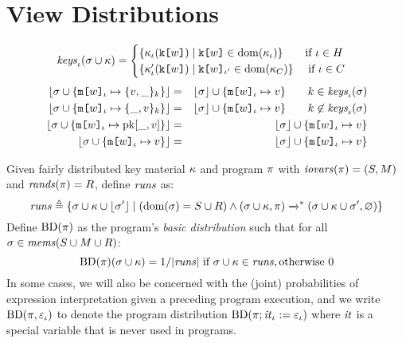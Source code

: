 \section{View Distributions}


\begin{definition}[Patterns]
  $$
  \mathit{keys}_{\iota}(\sigma \cup \kappa) =
  \begin{cases}
    \{ \kappa_\iota(\texttt{k[}w\texttt{]}) \mid \texttt{k[}w\texttt{]} \in \mathrm{dom}(\kappa_\iota) \} \qquad \text{if} \ \iota \in H \\
    \{ \kappa_\iota'(\texttt{k[}w\texttt{]}) \mid \texttt{k[}w\texttt{]}_{\iota'} \in \mathrm{dom}(\kappa_C)  \} \quad\ \text{if}\ \iota \in C
  \end{cases}
  $$
  \begin{eqnarray*}
    \lfloor \sigma \cup \{ \texttt{m[}w\texttt{]}_{\iota} \mapsto \{ v,\_ \}_{k} \} \rfloor &=&
    \lfloor \sigma \rfloor \cup \{ \texttt{m[}w\texttt{]}_{\iota} \mapsto v \} \qquad k \in \mathit{keys}_{\iota}(\sigma)\\
    \lfloor \sigma \cup \{ \texttt{m[}w\texttt{]}_{\iota} \mapsto \{ \_,v \}_{k} \} \rfloor &=&
    \lfloor \sigma \rfloor \cup \{ \texttt{m[}w\texttt{]}_{\iota} \mapsto v \} \qquad k \not\in \mathit{keys}_{\iota}(\sigma)\\
    \lfloor \sigma \cup \{ \texttt{m[}w\texttt{]}_{\iota} \mapsto \mathrm{pk}[\_,v]\} \rfloor &=&
    \lfloor \sigma \rfloor \cup \{ \texttt{m[}w\texttt{]}_{\iota} \mapsto v \} \\
    \lfloor \sigma \cup \{ \texttt{m[}w\texttt{]}_{\iota} \mapsto v\} \rfloor &=&
    \lfloor \sigma \rfloor \cup \{ \texttt{m[}w\texttt{]}_{\iota} \mapsto v \} 
  \end{eqnarray*}
\end{definition}

\begin{definition}
  \label{def-progtt}
  \label{definition-progtt}
  Given fairly distributed key material $\kappa$ and program $\pi$ with $\mathit{iovars}(\pi) = (S,M)$ and $\mathit{rands}(\pi) = R$,
  define $\mathit{runs}$ as:
  $$
  \mathit{runs} \triangleq \{ \sigma \cup \kappa \cup \lfloor \sigma' \rfloor \mid (\mathrm{dom}(\sigma) = S \cup R) \wedge (\sigma \cup \kappa,\pi) \xrightarrow{}^{*}
  (\sigma \cup \kappa \cup \sigma',\varnothing) \}
  $$
  Define $\mathrm{BD}(\pi)$ as the program's \emph{basic distribution} such that for all
  $\sigma \in \mathit{mems}(S \cup M \cup R)$:
  $$
  \mathrm{BD}(\pi)(\sigma \cup \kappa) =  1 / |\mathit{runs}| \ \text{if}\ \sigma \cup \kappa \in \mathit{runs}, \text{otherwise}\ 0
  $$
  In some cases, we will also be concerned with the (joint)
  probabilities of expression interpretation given a preceding program
  execution, and we write $\mathrm{BD}(\pi, \varepsilon_{\iota})$ to denote the program
  distribution $\mathrm{BD}(\pi;\mathit{it}_{\iota} := \varepsilon_{\iota})$ where $\mathit{it}$ is a
  special variable that is never used in programs.
\end{definition}

